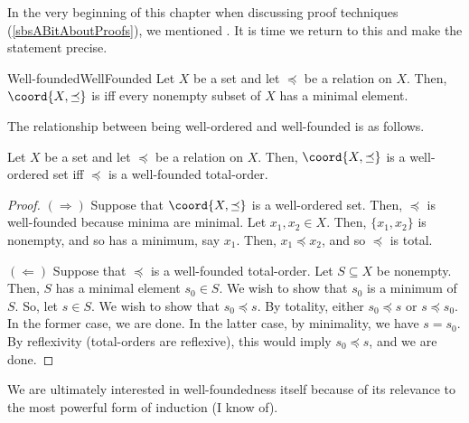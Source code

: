 In the very beginning of this chapter when discussing proof techniques (\cref{sbsABitAboutProofs}), we mentioned .  It is time we return to this and make the statement precise.
\begin{dfn}{Well-founded}{WellFounded}
	Let $X$ be a set and let $\preceq$ be a relation on $X$.  Then, $\coord{X,\preceq}$ is  iff every nonempty subset of $X$ has a minimal element.
\end{dfn}
The relationship between being well-ordered and well-founded is as follows.
\begin{prp}{}{}
	Let $X$ be a set and let $\preceq$ be a relation on $X$.  Then, $\coord{X,\preceq}$ is a well-ordered set iff $\preceq$ is a well-founded total-order.
	\begin{proof}
		$(\Rightarrow )$ Suppose that $\coord{X,\preceq}$ is a well-ordered set.  Then, $\preceq$ is well-founded because minima are minimal.  Let $x_1,x_2\in X$.  Then, $\{ x_1,x_2\}$ is nonempty, and so has a minimum, say $x_1$.  Then, $x_1\preceq x_2$, and so $\preceq$ is total.
		
		\blankline
		\noindent
		$(\Leftarrow )$ Suppose that $\preceq$ is a well-founded total-order.  Let $S\subseteq X$ be nonempty.  Then, $S$ has a minimal element $s_0\in S$.  We wish to show that $s_0$ is a minimum of $S$.  So, let $s\in S$.  We wish to show that $s_0\preceq s$.  By totality, either $s_0\preceq s$ or $s\preceq s_0$.  In the former case, we are done.  In the latter case, by minimality, we have $s=s_0$.  By reflexivity (total-orders are reflexive), this would imply $s_0\preceq s$, and we are done.
	\end{proof}
\end{prp}
We are ultimately interested in well-foundedness itself because of its relevance to the most powerful form of induction (I know of).
